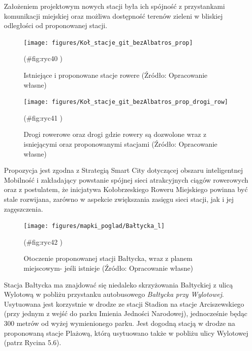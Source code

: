 \documentclass{amuthesis}
\begin{document}
Założeniem projektowym nowych stacji była ich spójność z przystankami komunikacji miejskiej oraz możliwa dostępność terenów zieleni w bliskiej odległości od proponowanej stacji.

\begin{figure}[t]

{\centering \texttt{[image: figures/Koł\_stacje\_git\_bezAlbatros\_prop]} 

}

\caption{Istniejące i proponowane stacje rowere (Źródło: Opracowanie własne)}(\#fig:ryc40 )
\end{figure}

\begin{figure}[t]

{\centering \texttt{[image: figures/Koł\_stacje\_git\_bezAlbatros\_prop\_drogi\_row]} 

}

\caption{Drogi rowerowe oraz drogi gdzie rowery są dozwolone wraz z isniejącymi oraz proponowanymi stacjami (Źródło: Opracowanie własne)}(\#fig:ryc41 )
\end{figure}

Propozycja jest zgodna z Strategią Smart City dotyczącej obszaru inteligentnej Mobilność i zakładający powstanie spójnej sieci atrakcyjnych ciągów rowerowych oraz z postulatem, że inicjatywa Kołobrzeskiego Roweru Miejskiego powinna być stale rozwijana, zarówno w aspekcie zwiększania zasięgu sieci stacji, jak i jej zagęszczenia.

\begin{figure}[t]

{\centering \texttt{[image: figures/mapki\_poglad/Bałtycka\_l]} 

}

\caption{Otoczenie proponowanej stacji Bałtycka, wraz z planem miejscowym- jeśli istnieje (Źródło: Opracowanie własne)}(\#fig:ryc42 )
\end{figure}

Stacja Bałtycka ma znajdować się niedaleko skrzyżowania Bałtyckiej z ulicą Wylotową w pobliżu przystanku autobusowego \emph{Bałtycka przy Wylotowej}. Usytuowana jest korzystnie w drodze ze stacji Stadion na stacje Arciszewskiego (przy jednym z wejść do parku Imienia Jedności Narodowej), jednocześnie będąc 300 metrów od wyżej wymienionego parku. Jest dogodną stacją w drodze na proponowaną stacje Plażową, którą usytuowano także w pobliżu ulicy Wylotowej (patrz Rycina 5.6).
\end{document}

